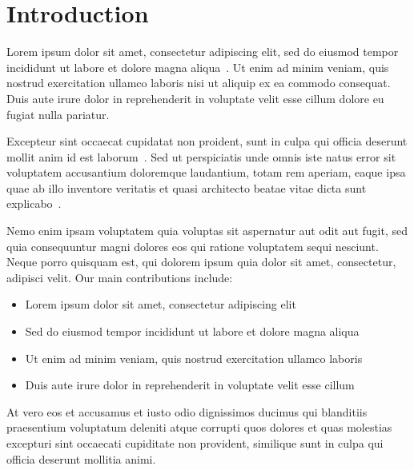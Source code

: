 \section{Introduction}

Lorem ipsum dolor sit amet, consectetur adipiscing elit, sed do eiusmod tempor incididunt ut labore et dolore magna aliqua~\cite{example2023}. Ut enim ad minim veniam, quis nostrud exercitation ullamco laboris nisi ut aliquip ex ea commodo consequat. Duis aute irure dolor in reprehenderit in voluptate velit esse cillum dolore eu fugiat nulla pariatur.

Excepteur sint occaecat cupidatat non proident, sunt in culpa qui officia deserunt mollit anim id est laborum~\cite{conference2022,survey2020}. Sed ut perspiciatis unde omnis iste natus error sit voluptatem accusantium doloremque laudantium, totam rem aperiam, eaque ipsa quae ab illo inventore veritatis et quasi architecto beatae vitae dicta sunt explicabo~\cite{textbook2021}.

Nemo enim ipsam voluptatem quia voluptas sit aspernatur aut odit aut fugit, sed quia consequuntur magni dolores eos qui ratione voluptatem sequi nesciunt. Neque porro quisquam est, qui dolorem ipsum quia dolor sit amet, consectetur, adipisci velit. Our main contributions include:

\begin{itemize}
\item Lorem ipsum dolor sit amet, consectetur adipiscing elit
\item Sed do eiusmod tempor incididunt ut labore et dolore magna aliqua
\item Ut enim ad minim veniam, quis nostrud exercitation ullamco laboris
\item Duis aute irure dolor in reprehenderit in voluptate velit esse cillum
\end{itemize}

At vero eos et accusamus et iusto odio dignissimos ducimus qui blanditiis praesentium voluptatum deleniti atque corrupti quos dolores et quas molestias excepturi sint occaecati cupiditate non provident, similique sunt in culpa qui officia deserunt mollitia animi.

